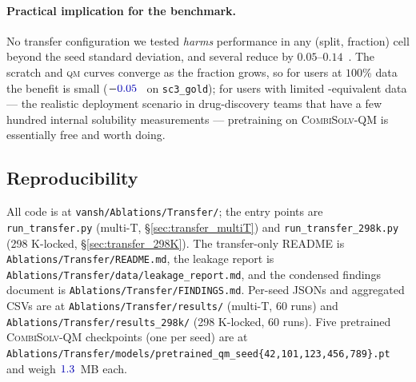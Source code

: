 \paragraph{Practical implication for the benchmark.}  No transfer
configuration we tested \emph{harms} performance in any
(split, fraction) cell beyond the seed standard deviation, and
several reduce \RMSE{} by $0.05$--$0.14$~\logS{}.  The scratch and
\textsc{qm} curves converge as the fraction grows, so for users at
$100$\% data the benefit is small ($-\numval{0.05}$~\logS{} on
\texttt{sc3\_gold}); for users with limited
\scthree{}-equivalent data --- the realistic deployment scenario in
drug-discovery teams that have a few hundred internal solubility
measurements --- pretraining on \textsc{CombiSolv-QM} is essentially
free and worth doing.

\subsection{Reproducibility}
\label{sec:transfer_repro}

All code is at \texttt{vansh/Ablations/Transfer/}; the entry points
are
\texttt{run\_transfer.py} (multi-T, §\ref{sec:transfer_multiT}) and
\texttt{run\_transfer\_298k.py} (298 K-locked,
§\ref{sec:transfer_298K}).  The transfer-only README is
\texttt{Ablations/Transfer/README.md}, the leakage report is
\texttt{Ablations/Transfer/data/leakage\_report.md}, and the
condensed findings document is
\texttt{Ablations/Transfer/FINDINGS.md}.  Per-seed JSONs and
aggregated CSVs are at
\texttt{Ablations/Transfer/results/}
(multi-T, $60$ runs) and
\texttt{Ablations/Transfer/results\_298k/}
(298 K-locked, $60$ runs).  Five pretrained
\textsc{CombiSolv-QM} checkpoints (one per seed) are at
\texttt{Ablations/Transfer/models/pretrained\_qm\_seed\{42,101,123,456,789\}.pt}
and weigh $\numval{1.3}$~MB each.
